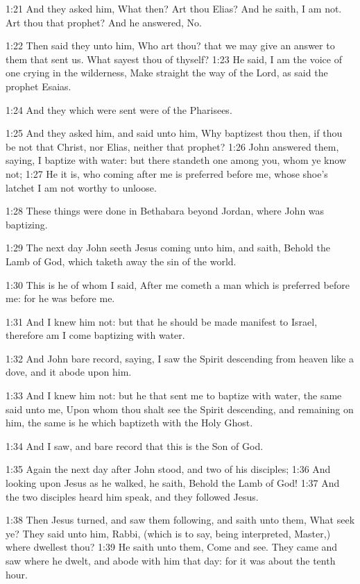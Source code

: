 1:21 And they asked him, What then? Art thou Elias? And he saith, I am not. Art thou that prophet? And he answered, No.

1:22 Then said they unto him, Who art thou? that we may give an answer to them that sent us. What sayest thou of thyself?  1:23 He said, I am the voice of one crying in the wilderness, Make straight the way of the Lord, as said the prophet Esaias.

1:24 And they which were sent were of the Pharisees.

1:25 And they asked him, and said unto him, Why baptizest thou then, if thou be not that Christ, nor Elias, neither that prophet?  1:26 John answered them, saying, I baptize with water: but there standeth one among you, whom ye know not; 1:27 He it is, who coming after me is preferred before me, whose shoe's latchet I am not worthy to unloose.

1:28 These things were done in Bethabara beyond Jordan, where John was baptizing.

1:29 The next day John seeth Jesus coming unto him, and saith, Behold the Lamb of God, which taketh away the sin of the world.

1:30 This is he of whom I said, After me cometh a man which is preferred before me: for he was before me.

1:31 And I knew him not: but that he should be made manifest to Israel, therefore am I come baptizing with water.

1:32 And John bare record, saying, I saw the Spirit descending from heaven like a dove, and it abode upon him.

1:33 And I knew him not: but he that sent me to baptize with water, the same said unto me, Upon whom thou shalt see the Spirit descending, and remaining on him, the same is he which baptizeth with the Holy Ghost.

1:34 And I saw, and bare record that this is the Son of God.

1:35 Again the next day after John stood, and two of his disciples; 1:36 And looking upon Jesus as he walked, he saith, Behold the Lamb of God!  1:37 And the two disciples heard him speak, and they followed Jesus.

1:38 Then Jesus turned, and saw them following, and saith unto them, What seek ye? They said unto him, Rabbi, (which is to say, being interpreted, Master,) where dwellest thou?  1:39 He saith unto them, Come and see. They came and saw where he dwelt, and abode with him that day: for it was about the tenth hour.

